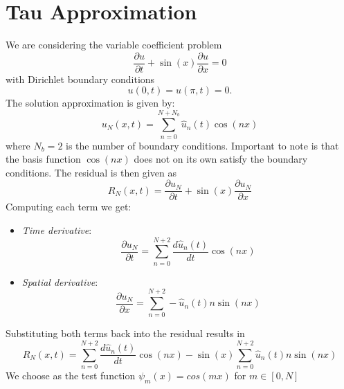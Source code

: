 \section{Tau Approximation}
We are considering the variable coefficient problem
\begin{equation}
	\frac{\partial u}{\partial t}+\sin (x) \frac{\partial u}{\partial x}=0
	\label{eq:pde3}
\end{equation}
with Dirichlet boundary conditions
\begin{equation}
	u(0,t) = u(\pi, t) = 0.
	\label{eq:bdc3}
\end{equation}
The solution approximation is given by:
\begin{equation}
	u_N(x,t) = \sum_{n=0}^{N+N_b} \hat{u}_n(t)\cos(nx)
	\label{eq:sol_approx}
\end{equation}
where $N_b = 2$ is the number of boundary conditions.\newline
Important to note is that the basis function $\cos(nx)$ does not on its own satisfy the boundary conditions.
The residual is then given as
\begin{equation}
	R_N(x, t) = \frac{\partial u_N}{\partial t}+\sin (x) \frac{\partial u_N}{\partial x}
\end{equation}
Computing each term we get:
\begin{itemize}
	\item \textit{Time derivative}:
	      \begin{equation}
		      \frac{\partial u_N}{\partial t} = \sum_{n=0}^{N+2} \frac{d\hat{u}_n(t)}{dt} \cos(nx)
		      \label{eq:tim_derv3}
	      \end{equation}
	\item \textit{Spatial derivative}:
	      \begin{equation}
		      \frac{\partial u_N}{\partial x} = \sum_{n=0}^{N+2} -\hat{u}_n(t) n \sin(nx)
		      \label{eq:spat_derv3}
	      \end{equation}
\end{itemize}
Substituting both terms back into the residual results in
\begin{equation}
	R_N(x, t) = \sum_{n=0}^{N+2} \frac{d\hat{u}_n(t)}{dt} \cos(nx) -  \sin(x) \sum_{n=0}^{N+2} \hat{u}_n(t) n \sin(nx)
	\label{eq:res3}
\end{equation}
We choose as the test function $\psi_m(x) = cos(mx)$ for $m \in [0, N]$

